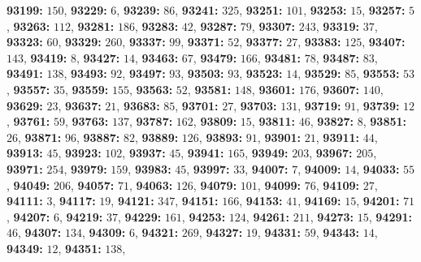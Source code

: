 \textsf{\bfseries 93199:} $150$, \textsf{\bfseries 93229:} $6$, \textsf{\bfseries 93239:} $86$, \textsf{\bfseries 93241:} $325$, \textsf{\bfseries 93251:} $101$, \textsf{\bfseries 93253:} $15$, \textsf{\bfseries 93257:} $5$, \textsf{\bfseries 93263:} $112$, \textsf{\bfseries 93281:} $186$, \textsf{\bfseries 93283:} $42$, \textsf{\bfseries 93287:} $79$, \textsf{\bfseries 93307:} $243$, \textsf{\bfseries 93319:} $37$, \textsf{\bfseries 93323:} $60$, \textsf{\bfseries 93329:} $260$, \textsf{\bfseries 93337:} $99$, \textsf{\bfseries 93371:} $52$, \textsf{\bfseries 93377:} $27$, \textsf{\bfseries 93383:} $125$, \textsf{\bfseries 93407:} $143$, \textsf{\bfseries 93419:} $8$, \textsf{\bfseries 93427:} $14$, \textsf{\bfseries 93463:} $67$, \textsf{\bfseries 93479:} $166$, \textsf{\bfseries 93481:} $78$, \textsf{\bfseries 93487:} $83$, \textsf{\bfseries 93491:} $138$, \textsf{\bfseries 93493:} $92$, \textsf{\bfseries 93497:} $93$, \textsf{\bfseries 93503:} $93$, \textsf{\bfseries 93523:} $14$, \textsf{\bfseries 93529:} $85$, \textsf{\bfseries 93553:} $53$, \textsf{\bfseries 93557:} $35$, \textsf{\bfseries 93559:} $155$, \textsf{\bfseries 93563:} $52$, \textsf{\bfseries 93581:} $148$, \textsf{\bfseries 93601:} $176$, \textsf{\bfseries 93607:} $140$, \textsf{\bfseries 93629:} $23$, \textsf{\bfseries 93637:} $21$, \textsf{\bfseries 93683:} $85$, \textsf{\bfseries 93701:} $27$, \textsf{\bfseries 93703:} $131$, \textsf{\bfseries 93719:} $91$, \textsf{\bfseries 93739:} $12$, \textsf{\bfseries 93761:} $59$, \textsf{\bfseries 93763:} $137$, \textsf{\bfseries 93787:} $162$, \textsf{\bfseries 93809:} $15$, \textsf{\bfseries 93811:} $46$, \textsf{\bfseries 93827:} $8$, \textsf{\bfseries 93851:} $26$, \textsf{\bfseries 93871:} $96$, \textsf{\bfseries 93887:} $82$, \textsf{\bfseries 93889:} $126$, \textsf{\bfseries 93893:} $91$, \textsf{\bfseries 93901:} $21$, \textsf{\bfseries 93911:} $44$, \textsf{\bfseries 93913:} $45$, \textsf{\bfseries 93923:} $102$, \textsf{\bfseries 93937:} $45$, \textsf{\bfseries 93941:} $165$, \textsf{\bfseries 93949:} $203$, \textsf{\bfseries 93967:} $205$, \textsf{\bfseries 93971:} $254$, \textsf{\bfseries 93979:} $159$, \textsf{\bfseries 93983:} $45$, \textsf{\bfseries 93997:} $33$, \textsf{\bfseries 94007:} $7$, \textsf{\bfseries 94009:} $14$, \textsf{\bfseries 94033:} $55$, \textsf{\bfseries 94049:} $206$, \textsf{\bfseries 94057:} $71$, \textsf{\bfseries 94063:} $126$, \textsf{\bfseries 94079:} $101$, \textsf{\bfseries 94099:} $76$, \textsf{\bfseries 94109:} $27$, \textsf{\bfseries 94111:} $3$, \textsf{\bfseries 94117:} $19$, \textsf{\bfseries 94121:} $347$, \textsf{\bfseries 94151:} $166$, \textsf{\bfseries 94153:} $41$, \textsf{\bfseries 94169:} $15$, \textsf{\bfseries 94201:} $71$, \textsf{\bfseries 94207:} $6$, \textsf{\bfseries 94219:} $37$, \textsf{\bfseries 94229:} $161$, \textsf{\bfseries 94253:} $124$, \textsf{\bfseries 94261:} $211$, \textsf{\bfseries 94273:} $15$, \textsf{\bfseries 94291:} $46$, \textsf{\bfseries 94307:} $134$, \textsf{\bfseries 94309:} $6$, \textsf{\bfseries 94321:} $269$, \textsf{\bfseries 94327:} $19$, \textsf{\bfseries 94331:} $59$, \textsf{\bfseries 94343:} $14$, \textsf{\bfseries 94349:} $12$, \textsf{\bfseries 94351:} $138$, 

